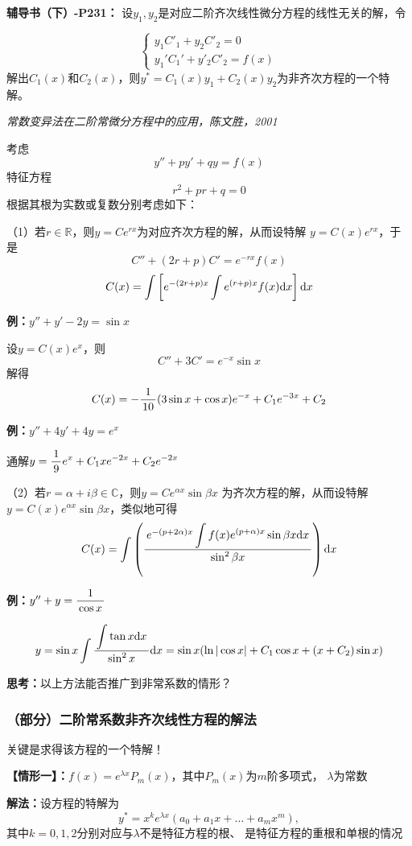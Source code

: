 \begin{shaded}
{\bf 辅导书（下）-P231：}
设$y_1,y_2$是对应二阶齐次线性微分方程的线性无关的解，令

$$
\left\{\begin{array}{l}
y_1C'_1+y_2C'_2=0\\
y_1'C_1'+y'_2C'_2=f(x)
\end{array}\right.
$$
解出$C_1(x)$和$C_2(x)$，则$y^*=C_1(x)y_1+C_2(x)y_2$为非齐次方程的一个特解。
\end{shaded}

{\it 常数变异法在二阶常微分方程中的应用，陈文胜，2001}

考虑
$$y''+py'+qy=f(x)$$
特征方程
$$r^2+pr+q=0$$
根据其根为实数或复数分别考虑如下：

（1）若$r\in\mathbb{R}$，则$y=Ce^{rx}$为对应齐次方程的解，从而设特解
$y=C(x)e^{rx}$，于是
$$C''+(2r+p)C'=e^{-rx}f(x)$$
$$C(x)=\displaystyle\int\left[e^{-(2r+p)x}\displaystyle\int e^{(r+p)x}f(x)\mathrm{d} x\right]\mathrm{d} x$$

{\bf 例：}$y''+y'-2y=\sin x$

设$y=C(x)e^x$，则
$$C''+3C'=e^{-x}\sin x$$
解得
$$C(x)=-\displaystyle\frac{\,{1}\,}{\,{10}\,}(3\sin x+\cos x)e^{-x}+C_1e^{-3x}+C_2$$

{\bf 例：}$y''+4y'+4y=e^x$

通解$y=\displaystyle\frac{\,{1}\,}{\,{9}\,}e^x+C_1xe^{-2x}+C_2e^{-2x}$

（2）若$r=\alpha+i\beta\in\mathbb{C}$，则$y=Ce^{\alpha x}\sin\beta x$
为齐次方程的解，从而设特解$y=C(x)e^{\alpha x}\sin\beta x$，类似地可得
$$C(x)=\displaystyle\int\left(\displaystyle\frac{\,{e^{-(p+2\alpha)x}\displaystyle\int f(x)
e^{(p+\alpha)x}\sin\beta x\mathrm{d} x}\,}{\,{\sin^2\beta x}\,}\right)\mathrm{d} x$$

{\bf 例：}$y''+y=\displaystyle\frac{\,{1}\,}{\,{\cos x}\,}$

$$y=\sin x\displaystyle\int\displaystyle\frac{\,{\displaystyle\int\tan x\mathrm{d} x}\,}{\,{\sin^2 x}\,}\mathrm{d} x
=\sin x(\ln|\cos x|+C_1\cos x+(x+C_2)\sin x)$$

{\bf 思考：}以上方法能否推广到非常系数的情形？

\subsubsection{（部分）二阶常系数非齐次线性方程的解法}

关键是求得该方程的一个特解！

{\bf 【情形一】：}$f(x)=e^{\lambda x}P_m(x)$，其中$P_m(x)$为$m$阶多项式，
$\lambda$为常数

{\bf 解法：}设方程的特解为
$$y^*=x^ke^{\lambda x}(a_0+a_1x+\ldots+a_mx^m),$$
其中$k=0,1,2$分别对应与$\lambda$不是特征方程的根、
是特征方程的重根和单根的情况

